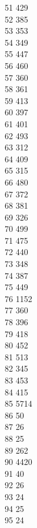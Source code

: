 { 51	429 \\
 52	385 \\
 53	353 \\
 54	349 \\
 55	447 \\
 56	460 \\
 57	360 \\
 58	361 \\
 59	413 \\
 60	397 \\
 61	401 \\
 62	493 \\
 63	312 \\
 64	409 \\
 65	315 \\
 66	480 \\
 67	372 \\
 68	381 \\
 69	326 \\
 70	499 \\
 71	475 \\
 72	440 \\
 73	348 \\
 74	387 \\
 75	449 \\
 76	1152 \\
 77	360 \\
 78	396 \\
 79	418 \\
 80	452 \\
 81	513 \\
 82	345 \\
 83	453 \\
 84	415 \\
 85	5714 \\
 86	50 \\
 87	26 \\
 88	25 \\
 89	262 \\
 90	4420 \\
 91	40 \\
 92	26 \\
 93	24 \\
 94	25 \\
 95	24 \\
}
